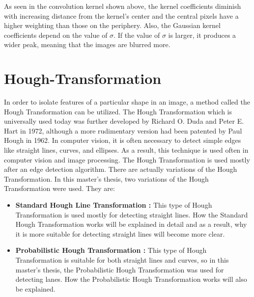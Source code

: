 As seen in the convolution kernel shown above, the kernel coefficients diminish with increasing distance from the kernel's center and the central pixels have a higher weighting than those on the periphery. Also, the Gaussian kernel coefficients depend on the value of $\sigma$. If the value of $\sigma$ is larger, it produces a wider peak, meaning that the images are blurred more.





















\section{Hough-Transformation}\label{sec:Hough-Transformation}
%
In order to isolate features of a particular shape in an image, a method called the Hough Transformation can be utilized. The Hough Transformation which is universally used today was further developed by Richard O. Duda and Peter E. Hart in 1972, although a more rudimentary version had been patented by Paul Hough in 1962.\cite{Hough_Transformation} In computer vision, it is often necessary to detect simple edges like straight lines, curves, and ellipses. As a result, this technique is used often in computer vision and image processing. The Hough Transformation is used mostly after an edge detection algorithm. There are actually variations of the Hough Transformation. In this master's thesis, two variations of the Hough Transformation were used. They are:

\begin{itemize}

\item \textbf{Standard Hough Line Transformation : }This type of Hough Transformation is used mostly for detecting straight lines. How the Standard Hough Transformation works will be explained in detail and as a result, why it is more suitable for detecting straight lines will become more clear.

\item \textbf{Probabilistic Hough Transformation : }This type of Hough Transformation is suitable for both straight lines and curves, so in this master's thesis, the Probabilistic Hough Transformation was used for detecting lanes. How the Probabilistic Hough Transformation works will also be explained.

\end{itemize}
%
